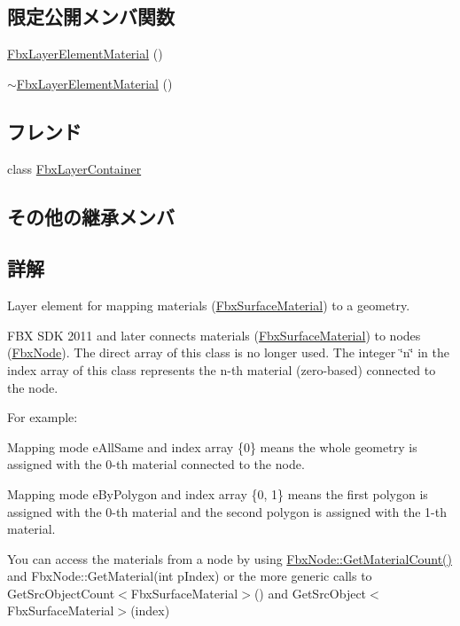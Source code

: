 \subsection*{限定公開メンバ関数}
\begin{DoxyCompactItemize}
\item 
\hyperlink{class_fbx_layer_element_material_ad5f7288e3fc7f3d58853b12390766fe3}{Fbx\+Layer\+Element\+Material} ()
\item 
\hyperlink{class_fbx_layer_element_material_aff5bc662b9c38efaea5b61de0d108088}{$\sim$\+Fbx\+Layer\+Element\+Material} ()
\end{DoxyCompactItemize}
\subsection*{フレンド}
\begin{DoxyCompactItemize}
\item 
class \hyperlink{class_fbx_layer_element_material_a791d2046ce60bf6f5fb85d9dc6242f2e}{Fbx\+Layer\+Container}
\end{DoxyCompactItemize}
\subsection*{その他の継承メンバ}


\subsection{詳解}
Layer element for mapping materials (\hyperlink{class_fbx_surface_material}{Fbx\+Surface\+Material}) to a geometry.

F\+BX S\+DK 2011 and later connects materials (\hyperlink{class_fbx_surface_material}{Fbx\+Surface\+Material}) to nodes (\hyperlink{class_fbx_node}{Fbx\+Node}). The direct array of this class is no longer used. The integer \char`\"{}n\char`\"{} in the index array of this class represents the n-\/th material (zero-\/based) connected to the node.

For example\+:

Mapping mode e\+All\+Same and index array \{0\} means the whole geometry is assigned with the 0-\/th material connected to the node.

Mapping mode e\+By\+Polygon and index array \{0, 1\} means the first polygon is assigned with the 0-\/th material and the second polygon is assigned with the 1-\/th material.

You can access the materials from a node by using \hyperlink{class_fbx_node_a00fabc04c839f665fa5d4a0b49859745}{Fbx\+Node\+::\+Get\+Material\+Count()} and Fbx\+Node\+::\+Get\+Material(int p\+Index) or the more generic calls to Get\+Src\+Object\+Count$<$\+Fbx\+Surface\+Material$>$() and Get\+Src\+Object$<$\+Fbx\+Surface\+Material$>$(index)

